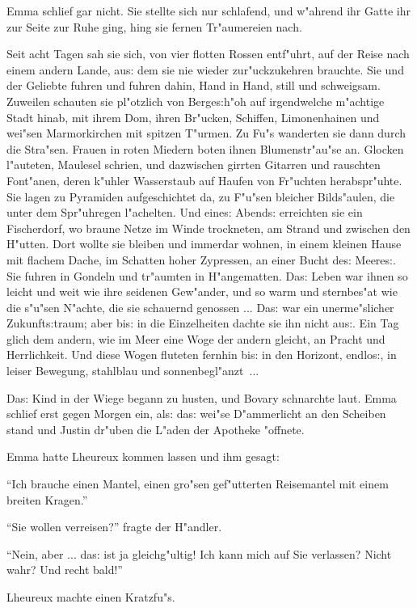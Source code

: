 \documentclass[oneside,12pt]{book}
\newcommand{\s}{s:}%
\begin{document}
Emma schlief gar nicht. Sie stellte sich nur schlafend, und
w"ahrend ihr Gatte ihr zur Seite zur Ruhe ging, hing sie fernen
Tr"aumereien nach.

Seit acht Tagen sah sie sich, von vier flotten Rossen entf"uhrt,
auf der Reise nach einem andern Lande, au{\s} dem sie nie wieder
zur"uckzukehren brauchte. Sie und der Geliebte fuhren und fuhren
dahin, Hand in Hand, still und schweigsam. Zuweilen schauten sie
pl"otzlich von Berge{\s}h"oh auf irgendwelche m"achtige Stadt
hinab, mit ihrem Dom, ihren Br"ucken, Schiffen, Limonenhainen und
wei"sen Marmorkirchen mit spitzen T"urmen. Zu Fu"s wanderten sie
dann durch die Stra"sen. Frauen in roten Miedern boten ihnen
Blumenstr"au"se an. Glocken l"auteten, Maulesel schrien, und
dazwischen girrten Gitarren und rauschten Font"anen, deren k"uhler
Wasserstaub auf Haufen von Fr"uchten herabspr"uhte. Sie lagen zu
Pyramiden aufgeschichtet da, zu F"u"sen bleicher Bilds"aulen, die
unter dem Spr"uhregen l"achelten. Und eine{\s} Abend{\s}
erreichten sie ein Fischerdorf, wo braune Netze im Winde
trockneten, am Strand und zwischen den H"utten. Dort wollte sie
bleiben und immerdar wohnen, in einem kleinen Hause mit flachem
Dache, im Schatten hoher Zypressen, an einer Bucht de{\s}
Meere{\s}. Sie fuhren in Gondeln und tr"aumten in H"angematten.
Da{\s} Leben war ihnen so leicht und weit wie ihre seidenen
Gew"ander, und so warm und sternbes"at wie die s"u"sen N"achte,
die sie schauernd genossen ... Da{\s} war ein unerme"slicher
Zukunft{\s}traum; aber bi{\s} in die Einzelheiten dachte sie ihn
nicht au{\s}. Ein Tag glich dem andern, wie im Meer eine Woge der
andern gleicht, an Pracht und Herrlichkeit. Und diese Wogen
fluteten fernhin bi{\s} in den Horizont, endlo{\s}, in leiser
Bewegung, stahlblau und sonnenbegl"anzt~...

Da{\s} Kind in der Wiege begann zu husten, und Bovary schnarchte
laut. Emma schlief erst gegen Morgen ein, al{\s} da{\s} wei"se
D"ammerlicht an den Scheiben stand und Justin dr"uben die L"aden
der Apotheke "offnete.

Emma hatte Lheureux kommen lassen und ihm gesagt:

"`Ich brauche einen Mantel, einen gro"sen gef"utterten Reisemantel
mit einem breiten Kragen."'

"`Sie wollen verreisen?"' fragte der H"andler.

"`Nein, aber ... da{\s} ist ja gleichg"ultig! Ich kann mich auf
Sie verlassen? Nicht wahr? Und recht bald!"'

Lheureux machte einen Kratzfu"s.
\end{document}
